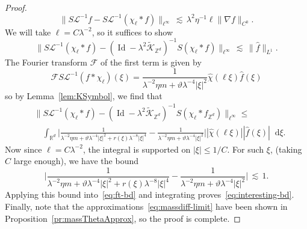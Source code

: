 \documentclass[11pt]{amsart}
\def\Real{{\mathbb R}}
\def\bbZ{{\mathbb Z}}
\newcommand{\diff}{\mathop{}\!\mathrm{d}}
\newcommand{\Id}{{\operatorname*{Id}}}
\newcommand{\Ft}[1]{{\widehat{#1}}}
\def\lsim{{\,\lesssim\,}}
\newcommand{\mcal}[1]{{\mathcal{#1}}}
\numberwithin{equation}{section}
\numberwithin{theorem}{section}
\begin{document}
\begin{proof}
\begin{equation}
\|S \mcal{L}^{-1} f - S\mcal{L}^{-1} (\chi_\ell\ast f)\|_{\ell^\infty} \lsim \lambda^2 \eta^{-1} \ell \|\nabla f\|_{C^0}.
\end{equation}
We will take $\ell = C\lambda^{-2}$, so it suffices to show
\begin{equation}
\label{eq:interesting-bd}
\|S \mcal{L}^{-1} (\chi_\ell \ast f) - (\Id-\lambda^{2}\tilde{\mathcal{K}}_{\mathbb{Z}^d})^{-1} S(\chi_\ell \ast f)\|_{\ell^\infty} \lsim \|\Ft{f}\|_{L^1}.
\end{equation}
The Fourier transform $\mcal{F}$ of the first term is given by
\[
\mcal{F}S\mcal{L}^{-1}(f\ast \chi_\ell)(\xi) = \frac{1}{\lambda^{-2}\eta m+\vartheta \lambda^{-4}|\xi|^2} \Ft{\chi}(\ell\xi) \Ft{f}(\xi)
\]
so by Lemma~\ref{lem:KSymbol}, we find that
\begin{equation}
\begin{split}
\label{eq:ft-bd}
&\|S\mcal{L}^{-1}(\chi_\ell\ast f) - (\Id-\lambda^{2}\tilde{\mcal{K}}_{\mathbb{Z}^d})^{-1}S(\chi_\ell\ast f_{\bbZ^d})\|_{\ell^\infty}\leq \\
&\quad\int_{\Real^{d}}
\Big|
\frac{1}{\lambda^{-2}\eta m + \vartheta \lambda^{-4} |\xi|^2 + r(\xi)\lambda^{-8}|\xi|^4}
-
\frac{1}{\lambda^{-2}\eta m+\vartheta \lambda^{-4}|\xi|^2}\Big| |\Ft{\chi}(\ell\xi)||\Ft{f}(\xi)| \diff \xi.
\end{split}
\end{equation}
Now since $\ell=C\lambda^{-2}$, the integral is supported on $|\xi|\leq 1/C$.
For such $\xi$, (taking $C$ large enough), we have the bound
\[
\Big|
\frac{1}{\lambda^{-2}\eta m + \vartheta \lambda^{-4} |\xi|^2 + r(\xi)\lambda^{-8}|\xi|^4}
-
\frac{1}{\lambda^{-2} \eta m+\vartheta \lambda^{-4}|\xi|^2}\Big| \lsim 1.
\]
Applying this bound into~\eqref{eq:ft-bd} and integrating proves~\eqref{eq:interesting-bd}.
Finally, note that the approximations~\eqref{eq:massdiff-limit} have been shown in Proposition~\ref{pr:massThetaApprox}, so the proof is complete.
\end{proof}
\end{document}
